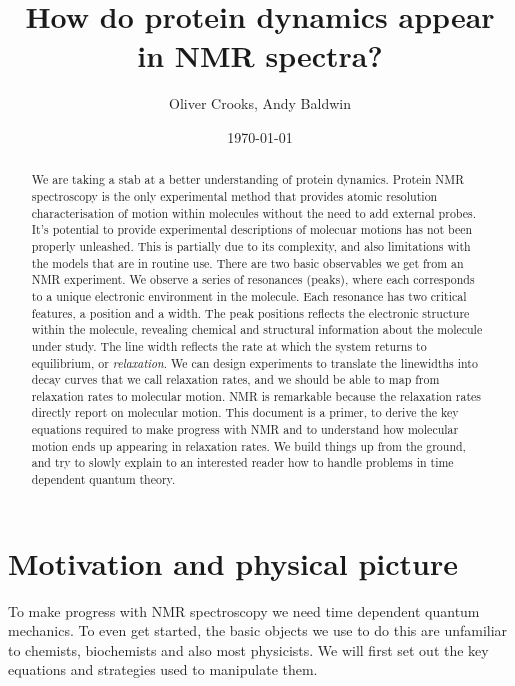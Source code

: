 \documentclass[notitlepage,11pt]{article}
\title{How do protein dynamics appear in NMR spectra?}
\author{Oliver Crooks, Andy Baldwin}
\date{\today}
\begin{document}
\maketitle

\onehalfspacing
\begin{abstract}
  We are taking a stab at a better understanding of protein dynamics. Protein NMR spectroscopy is the only experimental method that provides atomic resolution characterisation of motion within molecules without the need to add external probes. It's potential to provide experimental descriptions of molecuar motions has not been properly unleashed. This is partially due to its complexity, and also limitations with the models that are in routine use. There are two basic observables we get from an NMR experiment. We observe a series of resonances (peaks), where each corresponds to a unique electronic environment in the molecule. Each resonance has two critical features, a position and a width. The peak positions reflects the electronic structure within the molecule, revealing chemical and structural information about the molecule under study. The line width reflects the rate at which the system returns to equilibrium, or \emph{relaxation}. We can design experiments to translate the linewidths into decay curves that we call relaxation rates, and we should be able to map from relaxation rates to molecular motion. NMR is remarkable because the relaxation rates directly report on molecular motion. This document is a primer, to derive the key equations required to make progress with NMR and to understand how molecular motion ends up appearing in relaxation rates. We build things up from the ground, and try to slowly explain to an interested reader how to handle problems in time dependent quantum theory.
  \end{abstract}


\section{Motivation and physical picture}

To make progress with NMR spectroscopy we need time dependent quantum mechanics. To even get started, the basic objects we use to do this are unfamiliar to chemists, biochemists and also most physicists. We will first set out the key equations and strategies used to manipulate them.
\end{document}
